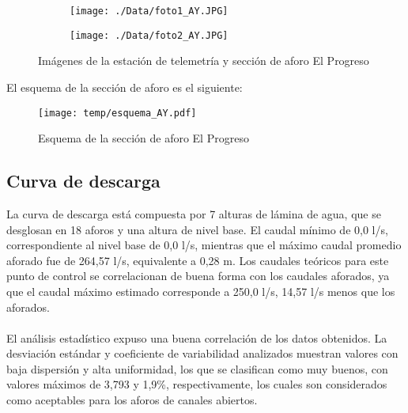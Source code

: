 \documentclass[]{article}
\begin{document}
\begin{figure}[H]
  \centering
\begin{subfigure}{.49\textwidth}
  \texttt{[image: ./Data/foto1\_AY.JPG]}
\end{subfigure}
\hfill
\begin{subfigure}{.49\textwidth}
  \texttt{[image: ./Data/foto2\_AY.JPG]}
\end{subfigure}
\caption{Imágenes de la estación de telemetría y sección de aforo El Progreso}
\label{fig:fotos_25}
\end{figure}

El esquema de la sección de aforo es el siguiente:

\begin{figure}[H]
  \centering
  \texttt{[image: temp/esquema\_AY.pdf]}
\caption{Esquema de la sección de aforo El Progreso}
\label{fig:Esquema_AY}
\end{figure}

\subsection{Curva de descarga}\label{curva-de-descarga-24}

La curva de descarga está compuesta por 7 alturas de lámina de agua, que se desglosan en 18 aforos y una altura de nivel base. El caudal mínimo de 0,0 l/s, correspondiente al nivel base de 0,0 l/s, mientras que el máximo caudal promedio aforado fue de 264,57 l/s, equivalente a 0,28 m. Los caudales teóricos para este punto de control se correlacionan de buena forma con los caudales aforados, ya que el caudal máximo estimado corresponde a 250,0 l/s, 14,57 l/s menos que los aforados.\\
\\
El análisis estadístico expuso una buena correlación de los datos obtenidos. La desviación estándar y coeficiente de variabilidad analizados muestran valores con baja dispersión y alta uniformidad, los que se clasifican como muy buenos, con valores máximos de 3,793 y 1,9\%, respectivamente, los cuales son considerados como aceptables para los aforos de canales abiertos.
\end{document}
